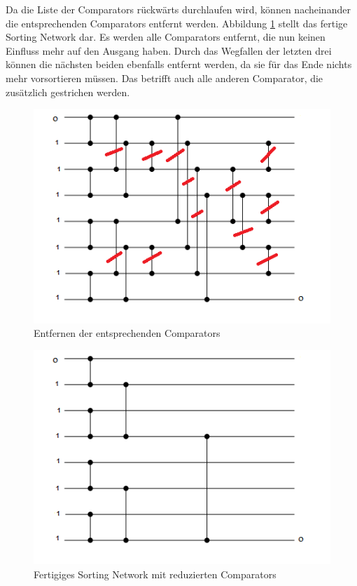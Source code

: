 \documentclass[a4,abstract=on]{scrartcl}
\begin{document}
Da die Liste der Comparators rückwärts durchlaufen wird, können nacheinander die entsprechenden Comparators entfernt werden. Abbildung \ref{fig:ownSorting1} stellt das fertige Sorting Network dar. Es werden alle Comparators entfernt, die nun keinen Einfluss mehr auf den Ausgang haben. Durch das Wegfallen der letzten drei können die nächsten beiden ebenfalls entfernt werden, da sie für das Ende nichts mehr vorsortieren müssen. Das betrifft auch alle anderen Comparator, die zusätzlich gestrichen werden. 

\begin{figure}[H]
\centering
\includegraphics[width=\textwidth]{ownSorting_2.png}
\caption{Entfernen der entsprechenden Comparators}
\label{fig:ownSorting1}
\end{figure}

\begin{figure}[H]
\centering
\includegraphics[width=\textwidth]{ownSorting_end.png}
\caption{Fertigiges Sorting Network mit reduzierten Comparators}
\label{fig:ownSortingEnd}
\end{figure}
\end{document}
